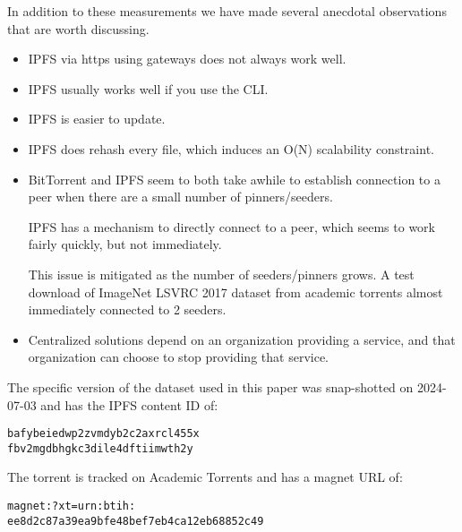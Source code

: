 \documentclass[10pt,twocolumn,letterpaper]{article}
\begin{document}
In addition to these measurements we have made several anecdotal observations
that are worth discussing.

\begin{itemize}
    \item IPFS via https using gateways does not always work well.
    \item IPFS usually works well if you use the CLI.
    \item IPFS is easier to update.
    \item IPFS does rehash every file, which induces an O(N) scalability constraint.

    \item BitTorrent and IPFS seem to both take awhile to establish connection
          to a peer when there are a small number of pinners/seeders.

          IPFS has a mechanism to directly connect to a peer, which seems to
          work fairly quickly, but not immediately.

          This issue is mitigated as the number of seeders/pinners grows.
          A test download of ImageNet LSVRC 2017 dataset from academic torrents
          almost immediately connected to 2 seeders.

    \item Centralized solutions depend on an organization providing a service,
          and that organization can choose to stop providing that service.
\end{itemize}

The specific version of the dataset used in this paper was snap-shotted on
2024-07-03 and has the IPFS content ID of:

\begin{lstlisting}[basicstyle=\normalsize]
bafybeiedwp2zvmdyb2c2axrcl455x
fbv2mgdbhgkc3dile4dftiimwth2y
\end{lstlisting}

The torrent is tracked on Academic Torrents \cite{academic_torrents_Cohen2014} and has a magnet URL of:

\begin{lstlisting}[basicstyle=\normalsize]
magnet:?xt=urn:btih:
ee8d2c87a39ea9bfe48bef7eb4ca12eb68852c49
\end{lstlisting}


\end{document}

